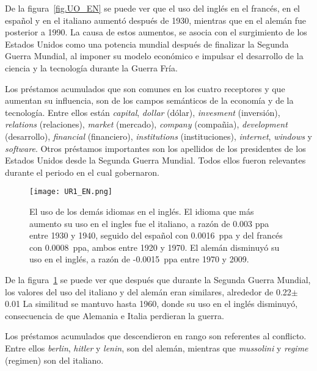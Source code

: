 De la figura~\ref{fig.UO_EN} se puede ver que el uso del inglés en el francés, en el español y en el italiano aumentó después de 1930, mientras que en el alemán fue posterior a 1990.  La causa de estos aumentos, se asocia con el surgimiento de los Estados Unidos como una potencia mundial después de finalizar la Segunda Guerra Mundial,  al  imponer  su modelo económico e impulsar el desarrollo de la ciencia y la tecnología durante la Guerra Fría.

Los préstamos acumulados que son comunes en los cuatro receptores y que aumentan su influencia, son de los campos semánticos de la economía y de la tecnología. Entre ellos están \textit{capital}, \textit{dollar} (dólar), \textit{invesment} (inversión), \textit{relations} (relaciones), \textit{market} (mercado), \textit{company} (compañia), \textit{development} (desarrollo), \textit{financial} (financiero),  \textit{institutions} (instituciones), \textit{internet}, \textit{windows} y \textit{software}. Otros préstamos importantes son los apellidos de los presidentes de los Estados Unidos desde la Segunda Guerra Mundial. Todos ellos fueron relevantes durante el periodo en el cual gobernaron. 
\label{EN-D}

\begin{figure}[h!]
	\centering
	\texttt{[image: UR1\_EN.png]}
	\caption{El uso de los demás idiomas en el inglés. El idioma que más aumento su uso en el ingles fue el italiano, a razón de 0.003 ppa entre 1930 y 1940, seguido del español con 0.0016~ppa y del francés con 0.0008~ppa, ambos entre 1920 y 1970. El alemán disminuyó su uso en el inglés, a razón de -0.0015~ppa entre 1970 y 2009.}
	\label{fig.UR_EN}
\end{figure} 


De la figura~\ref{fig.UR_EN} se puede ver que después que durante la Segunda Guerra Mundial, los valores del uso del italiano y del alemán eran similares, alrededor de 0.22$\pm$0.01 La similitud se mantuvo hasta 1960, donde su uso en el inglés disminuyó, consecuencia de que Alemania e Italia perdieran la guerra.

Los préstamos acumulados que descendieron en rango son referentes al conflicto. Entre ellos \textit{berlin}, \textit{hitler} y \textit{lenin}, son del alemán,  mientras que \textit{mussolini} y \textit{regime} (regimen) son del italiano. 

